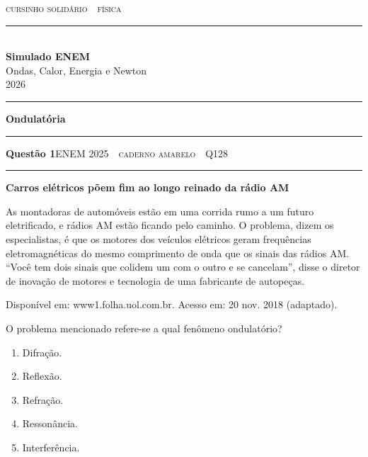 \documentclass[11pt,a4paper]{article}
\newcommand{\fonte}[1]{{\small\scshape\color{grafite}#1}}
\newenvironment{questao}[2]{%
  \par\addvspace{1.6em}
  \needspace{12\baselineskip}
  {\large\bfseries\color{vinho}Quest\~ao #1}\hfill #2\\[-0.55em]
  {\color{black!25}\rule{\linewidth}{0.4pt}}
  \par\nobreak\smallskip
  \noindent\begin{minipage}{\linewidth}\setlength{\parskip}{0.45em}%
}{\end{minipage}\par\addvspace{0.4em}}
\newcommand{\parte}[1]{%
  \needspace{18\baselineskip}
  \vspace{1.8em}
  {\Large\bfseries #1}\\[-0.55em]
  {\color{black!30}\rule{\linewidth}{0.5pt}}
  \par\nobreak\smallskip
}
\newcommand{\fontebib}[1]{{\raggedleft\scriptsize\color{grafite}#1\par}}
\begin{document}

\thispagestyle{empty}

{\scshape\color{vinho}cursinho solid\'ario \,\textperiodcentered\, f\'isica}\\[-0.5em]
{\color{vinho}\rule{\linewidth}{1.6pt}}\\[0.9em]
{\huge\bfseries Simulado ENEM}\\[0.35em]
{\LARGE Ondas, Calor, Energia e Newton}\\[0.7em]
\hfill {\color{grafite}2026}\\[-0.3em]
{\color{black!30}\rule{\linewidth}{0.5pt}}

\vspace{0.6em}


\parte{Ondulat\'oria}

\begin{questao}{1}{\fonte{ENEM 2025 \,\textperiodcentered\, caderno amarelo \,\textperiodcentered\, Q128}}
\textbf{Carros el\'etricos p\~oem fim ao longo reinado da r\'adio AM}

As montadoras de autom\'oveis est\~ao em uma corrida rumo a um futuro
eletrificado, e r\'adios AM est\~ao ficando pelo caminho. O problema, dizem
os especialistas, \'e que os motores dos ve\'iculos el\'etricos geram
frequ\^encias eletromagn\'eticas do mesmo comprimento de onda que os sinais
das r\'adios AM. ``Voc\^e tem dois sinais que colidem um com o outro e se
cancelam'', disse o diretor de inova\c{c}\~ao de motores e tecnologia de uma
fabricante de autope\c{c}as.

\fontebib{Dispon\'ivel em: www1.folha.uol.com.br. Acesso em: 20 nov. 2018 (adaptado).}

O problema mencionado refere-se a qual fen\^omeno ondulat\'orio?
\begin{enumerate}
  \item Difra\c{c}\~ao.
  \item Reflex\~ao.
  \item Refra\c{c}\~ao.
  \item Resson\^ancia.
  \item Interfer\^encia.
\end{enumerate}
\end{questao}
\end{document}
